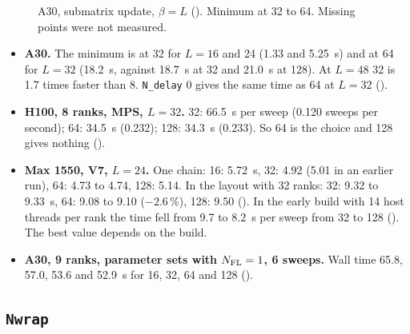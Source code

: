 \begin{figure}[h]
\centering
{}
\caption{A30, submatrix update, $\beta=L$ (). Minimum at 32 to 64. Missing points were not measured.}
\label{fig:ndelay}
\end{figure}

\begin{itemize}
\item \textbf{A30.} The minimum is at 32 for $L=16$ and 24 (1.33 and 5.25~s) and at 64 for $L=32$ (18.2~s, against 18.7~s at 32 and 21.0~s at 128). At $L=48$ 32 is 1.7 times faster than 8. \texttt{N\_delay} 0 gives the same time as 64 at $L=32$ ().
\item \textbf{H100, 8 ranks, MPS, $L=32$.} 32: 66.5~s per sweep (0.120 sweeps per second); 64: 34.5~s (0.232); 128: 34.3~s (0.233). So 64 is the choice and 128 gives nothing ().
\item \textbf{Max 1550, V7, $L=24$.} One chain: 16: 5.72~s, 32: 4.92 (5.01 in an earlier run), 64: 4.73 to 4.74, 128: 5.14. In the layout with 32 ranks: 32: 9.32 to 9.33~s, 64: 9.08 to 9.10 ($-2.6$\,\%), 128: 9.50 (). In the early build with 14 host threads per rank the time fell from 9.7 to 8.2~s per sweep from 32 to 128 (). The best value depends on the build.
\item \textbf{A30, 9 ranks, parameter sets with $N_{\rm FL}=1$, 6 sweeps.} Wall time 65.8, 57.0, 53.6 and 52.9~s for 16, 32, 64 and 128 ().
\end{itemize}

\subsection{\texttt{Nwrap}}

